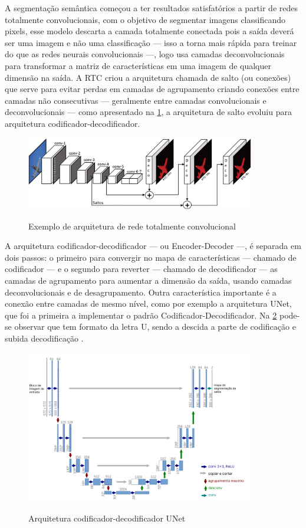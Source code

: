A segmentação semântica começou a ter resultados satisfatórios a partir de redes totalmente convolucionais, com o objetivo de segmentar imagens classificando pixels, esse modelo descarta a camada totalmente conectada pois a saída deverá ser uma imagem e não uma classificação — isso a torna mais rápida para treinar do que as redes neurais convolucionais —, logo usa camadas deconvolucionais para transformar a matriz de características em uma imagem de qualquer dimensão na saída. A RTC criou a arquitetura chamada de salto (ou conexões) que serve para evitar perdas em camadas de agrupamento criando conexões entre camadas não consecutivas — geralmente entre camadas convolucionais e deconvolucionais — como apresentado na \cref{fig:rtc}, a arquitetura de salto evoluiu para arquitetura codificador-decodificador.
\begin{figure}[ht]
	\caption{Exemplo de arquitetura de rede totalmente convolucional}
	\centering %
	\includegraphics[width=10cm]{figures/redes_totalmente_convolucionais.png} %
	\label{fig:rtc}
\end{figure}

A arquitetura codificador-decodificador — ou Encoder-Decoder —, é separada em dois passos: o primeiro para convergir no mapa de características — chamado de codificador — e o segundo para reverter — chamado de decodificador — as camadas de agrupamento para aumentar a dimensão da saída, usando camadas deconvolucionais e de desagrupamento. Outra característica importante é a conexão entre camadas de mesmo nível, como por exemplo a arquitetura UNet, que foi a primeira a implementar o padrão Codificador-Decodificador. Na \cref{fig:unet} pode-se observar que tem formato da letra U, sendo a descida a parte de codificação e subida decodificação \space\cite{dp_semantic_segmantation, lapix, unetArq}.

\begin{figure}[ht]
	\caption{Arquitetura codificador-decodificador UNet}
	\centering %
	\includegraphics[width=10cm]{figures/unet.png} %
	\label{fig:unet}
\end{figure}

